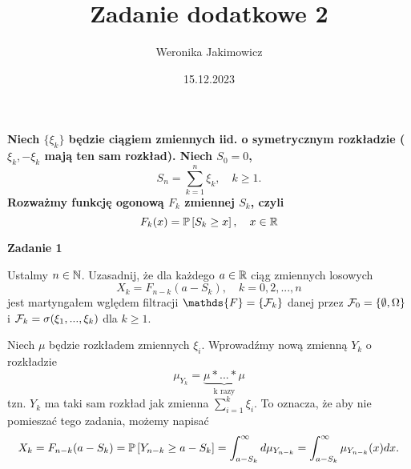 \documentclass{article}
\title{Zadanie dodatkowe 2}
\author{Weronika Jakimowicz}
\date{15.12.2023}
\newenvironment{zadanko}[1]{
  \bfseries{\large\color{orange}Zadanie #1}
}%
{}
\begin{document}
\maketitle
\thispagestyle{empty}

{\bfseries
Niech $\{\xi_k\}$ będzie ciągiem zmiennych iid. o symetrycznym rozkładzie ($\xi_k,-\xi_k$ mają ten sam rozkład). Niech $S_0=0$,
$$S_n=\sum_{k=1}^n\xi_k,\quad k\geq 1.$$
Rozważmy funkcję ogonową $F_k$ zmiennej $S_k$, czyli
$$F_k(x)=\prob{S_k\geq x},\quad x\in\R$$
}

\begin{zadanko}{1}
  Ustalmy $n\in\operatorname{\mathbb{N}}$. Uzasadnij, że dla każdego $a\in\operatorname{\mathbb{R}}$ ciąg zmiennych losowych 
  $$X_k=F_{n-k}(a-S_k),\quad k=0,2,...,n$$
  jest martyngałem wględem filtracji $\mathds{F}=\{\set{F}_k\}$ danej przez $\mathcal{F}_0=\{\emptyset,\Omega\}$ i $\mathcal{F}_k=\sigma(\xi_1,...,\xi_k)$ dla $k\geq 1$.
\end{zadanko}

%

Niech $\mu$ będzie rozkładem zmiennych $\xi_i$. Wprowadźmy nową zmienną $Y_k$ o rozkładzie
$$\mu_{Y_k}=\underbrace{\mu\ast...\ast\mu}_{\text{k razy}}$$
tzn. $Y_k$ ma taki sam rozkład jak zmienna $\sum_{i=1}^k\xi_i$. To oznacza, że aby nie pomieszać tego zadania, możemy napisać
$$X_k=F_{n-k}(a-S_k)=\prob{Y_{n-k}\geq a-S_k}=\int_{a-S_k}^\infty d\mu_{Y_{n-k}}=\int_{a-S_k}^\infty \mu_{Y_{n-k}}(x)dx.$$
\end{document}

